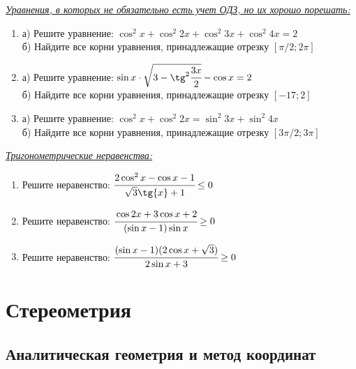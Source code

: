 \documentclass[12pt]{article}
\begin{document}
\noindent\underline{\textit{Уравнения, в которых не обязательно есть учет ОДЗ, но их хорошо порешать:}}

\begin{enumerate}[start=1,label={\itshape\bfseries \arabic*.}]

\item а) Решите уравнение: $\cos^2{x} + \cos^2{2x} + \cos^2{3x} + \cos^2{4x} = 2$\\
      б) Найдите все корни уравнения, принадлежащие отрезку $[\pi / 2; 2\pi]$

\item а) Решите уравнение: $\sin{x} \cdot \sqrt{3 - \tg^2{\cfrac{3x}{2}}} - \cos{x} = 2$\\
      б) Найдите все корни уравнения, принадлежащие отрезку $[-17; 2]$

\item а) Решите уравнение: $\cos^2{x} + \cos^2{2x} = \sin^2{3x} + \sin^2{4x}$\\
      б) Найдите все корни уравнения, принадлежащие отрезку $[3\pi / 2; 3\pi]$

\end{enumerate}

\noindent\underline{\textit{Тригонометрические неравенства:}}

\begin{enumerate}[start=1,label={\itshape\bfseries \arabic*.}]

\item Решите неравенство: $\cfrac{2\cos^2{x} - \cos{x} - 1}{\sqrt{3} \tg{x} + 1} \le 0$

\item Решите неравенство: $\cfrac{\cos{2x} + 3\cos{x} + 2}{(\sin{x} - 1)\sin{x}} \ge 0$

\item Решите неравенство: $\cfrac{(\sin{x} - 1)(2\cos{x} + \sqrt{3})}{2\sin{x} + 3} \ge 0$

\end{enumerate}




        \section{Стереометрия}
        \subsection{Аналитическая геометрия и метод координат}
\end{document}
